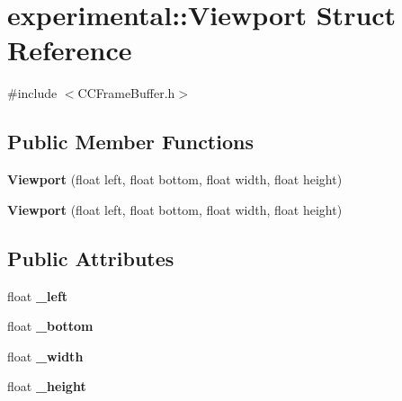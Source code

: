 \hypertarget{structexperimental_1_1Viewport}{}\section{experimental\+:\+:Viewport Struct Reference}
\label{structexperimental_1_1Viewport}


{\ttfamily \#include $<$C\+C\+Frame\+Buffer.\+h$>$}

\subsection*{Public Member Functions}
\begin{DoxyCompactItemize}
\item 
\mbox{\label{structexperimental_1_1Viewport_a6acc0b413276db05bdd5d5d81a63db19}} 
{\bfseries Viewport} (float left, float bottom, float width, float height)
\item 
\mbox{\label{structexperimental_1_1Viewport_a6acc0b413276db05bdd5d5d81a63db19}} 
{\bfseries Viewport} (float left, float bottom, float width, float height)
\end{DoxyCompactItemize}
\subsection*{Public Attributes}
\begin{DoxyCompactItemize}
\item 
\mbox{\label{structexperimental_1_1Viewport_a8047e152af6349efaffd17844452cb74}} 
float {\bfseries \+\_\+left}
\item 
\mbox{\label{structexperimental_1_1Viewport_a7792a9ec05c6e5f245d5a3a38943ed33}} 
float {\bfseries \+\_\+bottom}
\item 
\mbox{\label{structexperimental_1_1Viewport_a081f7756632043d65cf4c048ba935ccc}} 
float {\bfseries \+\_\+width}
\item 
\mbox{\label{structexperimental_1_1Viewport_a01b4036f070e0cc22e8c91610ca35d21}} 
float {\bfseries \+\_\+height}
\end{DoxyCompactItemize}


